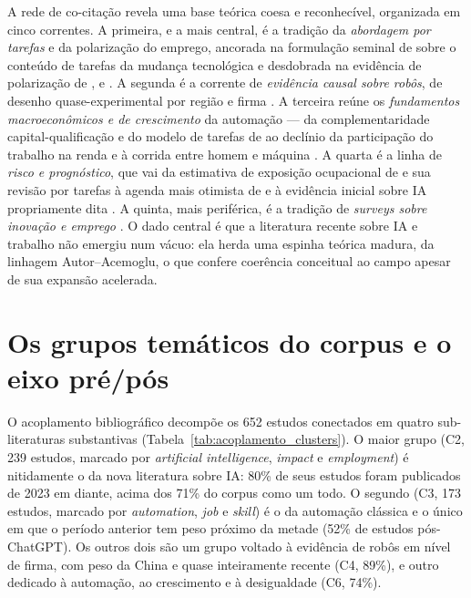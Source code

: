 A rede de co-citação revela uma base teórica coesa e reconhecível, organizada em
cinco correntes. A primeira, e a mais central, é a tradição da \emph{abordagem
por tarefas} e da polarização do emprego, ancorada na formulação seminal de
\textcite{autorLevyMurnane2003} sobre o conteúdo de tarefas da mudança
tecnológica e desdobrada na evidência de polarização de
\textcite{autorDorn2013}, \textcite{goosManningSalomons2014} e
\textcite{goosManning2007}. A segunda é a corrente de \emph{evidência causal
sobre robôs}, de desenho quase-experimental por região e firma
\parencite{acemogluRestrepo2020robots, graetzMichaels2018, dauth2021}. A
terceira reúne os \emph{fundamentos macroeconômicos e de crescimento} da
automação --- da complementaridade capital-qualificação
\parencite{krusell2000} e do modelo de tarefas de \textcite{zeira1998} ao
declínio da participação do trabalho na renda \parencite{karabarbounisNeiman2014}
e à corrida entre homem e máquina \parencite{acemogluRestrepo2018}. A quarta é a
linha de \emph{risco e prognóstico}, que vai da estimativa de exposição
ocupacional de \textcite{frey2017} e sua revisão por tarefas
\parencite{arntzGregoryZierahn2017} à agenda mais otimista de
\textcite{autor2015} e à evidência inicial sobre IA propriamente dita
\parencite{acemogluVacancies2022, brynjolfssonMitchellRock2018}. A quinta, mais
periférica, é a tradição de \emph{surveys sobre inovação e emprego}
\parencite{vivarelli2014, calvinoVirgillito2017, mondolo2021}. O dado central é
que a literatura recente sobre IA e trabalho não emergiu num vácuo: ela herda uma
espinha teórica madura, da linhagem Autor--Acemoglu, o que confere coerência
conceitual ao campo apesar de sua expansão acelerada.

\section{Os grupos temáticos do corpus e o eixo pré/pós}

O acoplamento bibliográfico decompõe os 652 estudos conectados em quatro
sub-literaturas substantivas (Tabela~\ref{tab:acoplamento_clusters}). O maior
grupo (C2, 239 estudos, marcado por \textit{artificial intelligence},
\textit{impact} e \textit{employment}) é nitidamente o da nova literatura sobre
IA: 80\% de seus estudos foram publicados de 2023 em diante, acima dos 71\% do
corpus como um todo. O segundo (C3, 173 estudos, marcado por
\textit{automation}, \textit{job} e \textit{skill}) é o da automação clássica e
o único em que o período anterior tem peso próximo da metade (52\% de estudos
pós-ChatGPT). Os outros dois são um grupo voltado à evidência de robôs em nível
de firma, com peso da China e quase inteiramente recente (C4, 89\%), e outro
dedicado à automação, ao crescimento e à desigualdade (C6, 74\%).

